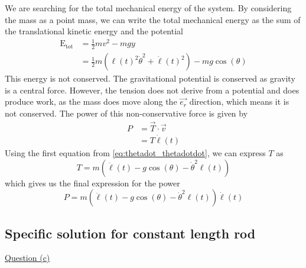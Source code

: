 We are searching for the total mechanical energy of the system. By considering the mass as a point mass, we can write the total mechanical energy as the sum of the translational kinetic energy and the potential
\begin{equation}
    \begin{aligned}
        \mathrm{E_{tot}} &= \frac{1}{2}mv^2 - mgy \\
        &= \frac{1}{2}m(\ell(t)^2 \dot\theta^2 + \dot\ell(t)^2) - mg\cos(\theta)
    \end{aligned}
\end{equation}
This energy is not conserved. The gravitational potential is conserved as gravity is a central force. However, the tension does not derive from a potential and does produce work, as the mass does move along the \(\vec{e_r}\) direction, which means it is not conserved. The power of this non-conservative force is given by
\begin{equation}
    \begin{aligned}
        P &= \vec{T} \cdot \vec{v} \\
        &= T \dot\ell(t)
    \end{aligned}
\end{equation}
Using the first equation from \autoref{eq:thetadot_thetadotdot}, we can express \(T\) as
\begin{equation}
    T = m(\ddot\ell(t) - g\cos(\theta) - \dot\theta^2 \ell(t))
\end{equation}
which gives us the final expression for the power
\begin{equation}
    P = m(\ddot\ell(t) - g\cos(\theta) - \dot\theta^2 \ell(t)) \dot\ell(t)
\end{equation}

\subsection{Specific solution for constant length rod}
\label{sec:analytic:constant_length}
\underline{Question (c)}


